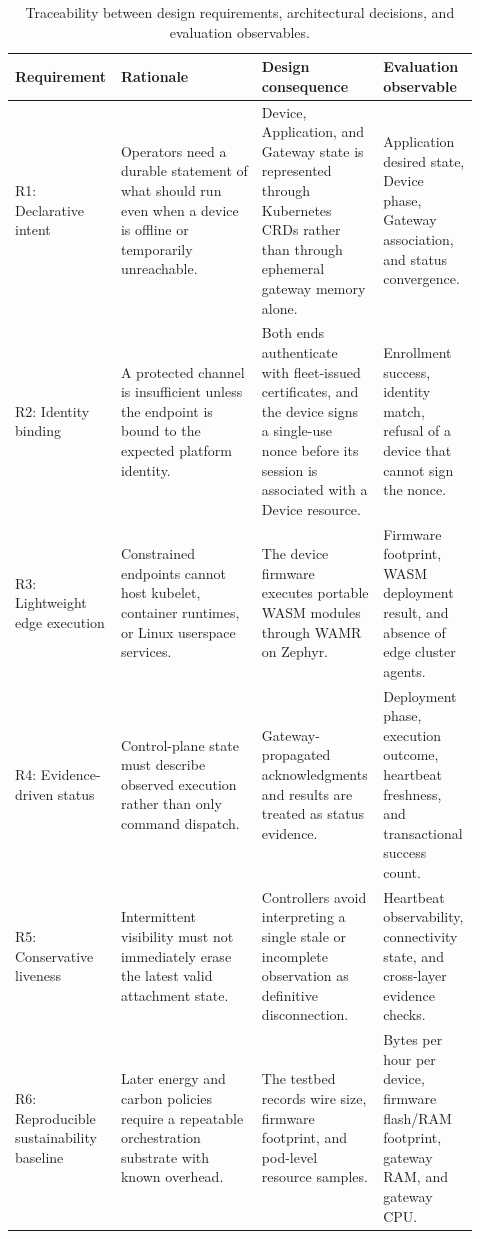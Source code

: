 \begin{table}[pos=t]
\centering
\caption{Traceability between design requirements, architectural decisions, and evaluation observables.}
\label{tab:requirements-traceability}
\footnotesize
\setlength{\tabcolsep}{3pt}
\begin{tabular}{p{0.17\linewidth} p{0.30\linewidth} p{0.25\linewidth} p{0.20\linewidth}}
\toprule
\textbf{Requirement} & \textbf{Rationale} & \textbf{Design consequence} & \textbf{Evaluation observable} \\
\midrule
R1: Declarative intent & Operators need a durable statement of what should run even when a device is offline or temporarily unreachable. & Device, Application, and Gateway state is represented through Kubernetes CRDs rather than through ephemeral gateway memory alone. & Application desired state, Device phase, Gateway association, and status convergence. \\
R2: Identity binding & A protected channel is insufficient unless the endpoint is bound to the expected platform identity. & Both ends authenticate with fleet-issued certificates, and the device signs a single-use nonce before its session is associated with a Device resource. & Enrollment success, identity match, refusal of a device that cannot sign the nonce. \\
R3: Lightweight edge execution & Constrained endpoints cannot host kubelet, container runtimes, or Linux userspace services. & The device firmware executes portable WASM modules through WAMR on Zephyr. & Firmware footprint, WASM deployment result, and absence of edge cluster agents. \\
R4: Evidence-driven status & Control-plane state must describe observed execution rather than only command dispatch. & Gateway-propagated acknowledgments and results are treated as status evidence. & Deployment phase, execution outcome, heartbeat freshness, and transactional success count. \\
R5: Conservative liveness & Intermittent visibility must not immediately erase the latest valid attachment state. & Controllers avoid interpreting a single stale or incomplete observation as definitive disconnection. & Heartbeat observability, connectivity state, and cross-layer evidence checks. \\
R6: Reproducible sustainability baseline & Later energy and carbon policies require a repeatable orchestration substrate with known overhead. & The testbed records wire size, firmware footprint, and pod-level resource samples. & Bytes per hour per device, firmware flash/RAM footprint, gateway RAM, and gateway CPU. \\
\bottomrule
\end{tabular}
\end{table}
\endgroup

